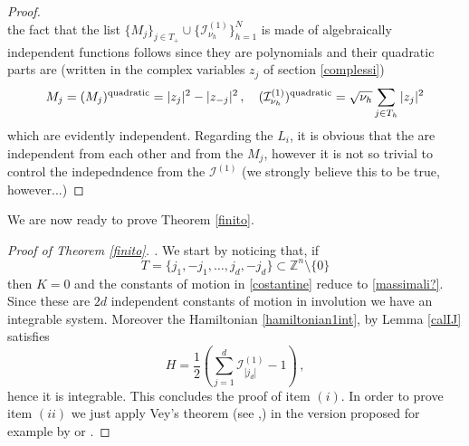 \documentclass[reqno,11pt]{amsart}
\theoremstyle{plain}
\numberwithin{equation}{section}
\newcommand{\Z}{\mathbb{Z}}
\newcommand{\cI}{{\mathcal I}}
\begin{document}
{\begin{proof}
\begin{equation}
	\end{equation}
	the fact that  the list $\{M_j\}_{j\in T_+}\cup\{\cI^{(1)}_{\nu_h}\}_{h=1}^N$ is made of algebraically independent functions follows since they are polynomials and their quadratic parts are (written in the complex variables $z_j$ of section \ref{complessi})
	\[
	M_j=(M_j)^{\rm quadratic} = |z_j|^2-|z_{-j}|^2\,,\quad (\cI_{\nu_h}^{(1)})^{\rm quadratic} = \sqrt{\nu_h}\sum_{j\in T_h} |z_j|^2
	\]
	which are evidently independent. Regarding the $L_i$, it is obvious that the are independent from each other and from the $M_j$, however it is not so trivial to control the indepedndence from the $\cI^{(1)}$ (we strongly believe this to be true, however...)
\end{proof}
We are now ready to prove Theorem \ref{finito}.
\begin{proof}[Proof of Theorem \ref{finito}. ]
	We start by noticing that, if $$T=\{j_1,-j_1,\dots, j_d,-j_d\}\subset  \Z^n\setminus\{0\}$$ then $K=0$ and the constants of motion in \eqref{costantine} reduce to \eqref{massimali?}. Since these are $2d$ independent constants of motion in involution we have an integrable system. Moreover the Hamiltonian \ref{hamiltonian1int}, by Lemma \ref{calIJ} satisfies
	\[
	H= \frac12 (\sum_{j=1}^d \cI^{(1)}_{|j_d|} -1)\,,
	\]
	hence it is integrable. This concludes the proof of item $(i)$. In order to prove item $(ii)$ we just apply Vey's theorem (see \cite{Vey1978},\cite{Eliasson1990}) in the version proposed for example by \cite{Ito1989} or \cite{Stolovitch2000}.
\end{proof}
}
\end{document}
